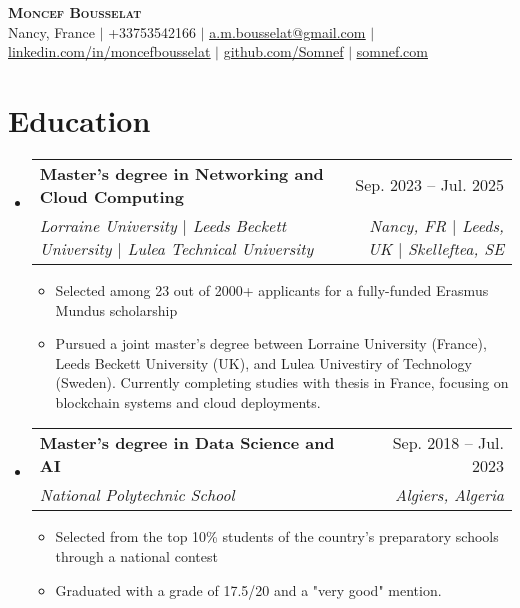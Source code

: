 \documentclass[letterpaper,11t]{article}
\makeatletter
\newcommand{\resumeItem}[1]{
  \item\small{
    {#1 \vspace{-2pt}}
  }
}
\newcommand{\resumeSubheading}[4]{
  \vspace{-2pt}\item
    \begin{tabular*}{0.97\textwidth}[t]{l@{\extracolsep{\fill}}r}
      \textbf{#1} & #2 \\
      \textit{\small#3} & \textit{\small #4} \\
    \end{tabular*}\vspace{-7pt}
}
\newcommand{\resumeSubHeadingListStart}{\begin{itemize}[leftmargin=0.15in, label={}]}
\newcommand{\resumeSubHeadingListEnd}{\end{itemize}}
\newcommand{\resumeItemListStart}{\begin{itemize}}
\newcommand{\resumeItemListEnd}{\end{itemize}\vspace{-5pt}}
\makeatother
\begin{document}

\begin{center}
    \textbf{\Huge \scshape Moncef Bousselat} \\ \vspace{1pt}
    \small Nancy, France $|$ 
    \small +33753542166 $|$ 
    \href{mailto:a.m.bousselat@gmail.com@gmail.com}{\underline{a.m.bousselat@gmail.com}} $|$ 
    \href{https://www.linkedin.com/in/moncefbousselat/}{\underline{linkedin.com/in/moncefbousselat}} $|$
    \href{https://github.com/Somnef}{\underline{github.com/Somnef}} $|$
    \href{https://www.somnef.com}{\underline{somnef.com}}
\end{center}


\section{Education}
    \resumeSubHeadingListStart
        \resumeSubheading
        {Master's degree in Networking and Cloud Computing}{Sep. 2023 -- Jul. 2025}
        {Lorraine University $|$ Leeds Beckett University $|$ Lulea Technical University}{Nancy, FR $|$ Leeds, UK $|$ Skelleftea, SE}
            \resumeItemListStart
                \resumeItem{Selected among 23 out of 2000+ applicants for a fully-funded Erasmus Mundus scholarship}
                \resumeItem{Pursued a joint master's degree between Lorraine University (France), Leeds Beckett University (UK), and Lulea Univestiry of Technology (Sweden). Currently completing studies with thesis in France, focusing on blockchain systems and cloud deployments.}
            \resumeItemListEnd
      
        \resumeSubheading
        {Master's degree in Data Science and AI}{Sep. 2018 -- Jul. 2023}
        {National Polytechnic School}{Algiers, Algeria}
            \resumeItemListStart
                \resumeItem{Selected from the top 10\% students of the country's preparatory schools through a national contest}
                \resumeItem{Graduated with a grade of 17.5/20 and a "very good" mention.}
            \resumeItemListEnd
  \resumeSubHeadingListEnd
\end{document}
